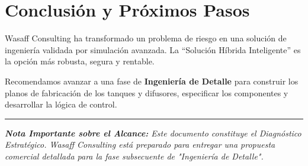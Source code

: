 \documentclass[11pt, a4paper]{article}
\begin{document}
\section{Conclusión y Próximos Pasos}
Wasaff Consulting ha transformado un problema de riesgo en una solución de ingeniería validada por simulación avanzada. La ``Solución Híbrida Inteligente'' es la opción más robusta, segura y rentable.

Recomendamos avanzar a una fase de \textbf{Ingeniería de Detalle} para construir los planos de fabricación de los tanques y difusores, especificar los componentes y desarrollar la lógica de control.

\vspace{1.5cm}
\begin{center}
\rule{0.8\textwidth}{0.4pt} \vspace{0.3cm}
\parbox{0.8\textwidth}{\footnotesize\itshape \textbf{Nota Importante sobre el Alcance:} Este documento constituye el Diagnóstico Estratégico. Wasaff Consulting está preparado para entregar una propuesta comercial detallada para la fase subsecuente de "Ingeniería de Detalle".}
\end{center}
\end{document}
